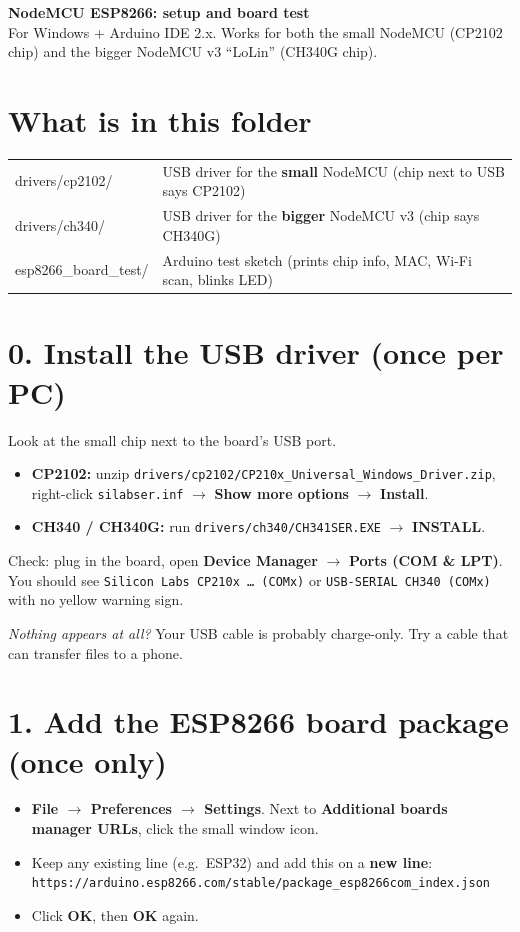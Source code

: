 \documentclass[11pt]{article}
\newcommand{\menu}[1]{\textbf{#1}}
\begin{document}
{\LARGE\bfseries NodeMCU ESP8266: setup and board test}\\[4pt]
For Windows + Arduino IDE 2.x. Works for both the small NodeMCU (CP2102 chip) and the bigger NodeMCU v3 ``LoLin'' (CH340G chip).

\section*{What is in this folder}
\begin{tabular}{@{}>{\ttfamily}l l@{}}
drivers/cp2102/ & USB driver for the \textbf{small} NodeMCU (chip next to USB says CP2102) \\
drivers/ch340/ & USB driver for the \textbf{bigger} NodeMCU v3 (chip says CH340G) \\
esp8266\_board\_test/ & Arduino test sketch (prints chip info, MAC, Wi-Fi scan, blinks LED) \\
\end{tabular}

\section*{0. Install the USB driver (once per PC)}
Look at the small chip next to the board's USB port.
\begin{itemize}
\item \textbf{CP2102:} unzip \texttt{drivers/cp2102/CP210x\_Universal\_Windows\_Driver.zip}, right-click \texttt{silabser.inf} $\rightarrow$ \menu{Show more options} $\rightarrow$ \menu{Install}.
\item \textbf{CH340 / CH340G:} run \texttt{drivers/ch340/CH341SER.EXE} $\rightarrow$ \menu{INSTALL}.
\end{itemize}
Check: plug in the board, open \menu{Device Manager} $\rightarrow$ \menu{Ports (COM \& LPT)}. You should see
\texttt{Silicon Labs CP210x \dots\ (COMx)} or \texttt{USB-SERIAL CH340 (COMx)} with no yellow warning sign.

\textit{Nothing appears at all?} Your USB cable is probably charge-only. Try a cable that can transfer files to a phone.

\section*{1. Add the ESP8266 board package (once only)}
\begin{itemize}
\item \menu{File $\rightarrow$ Preferences $\rightarrow$ Settings}. Next to \menu{Additional boards manager URLs}, click the small window icon.
\item Keep any existing line (e.g.\ ESP32) and add this on a \textbf{new line}:\\
\texttt{https://arduino.esp8266.com/stable/package\_esp8266com\_index.json}
\item Click \menu{OK}, then \menu{OK} again.
\end{itemize}
\end{document}
